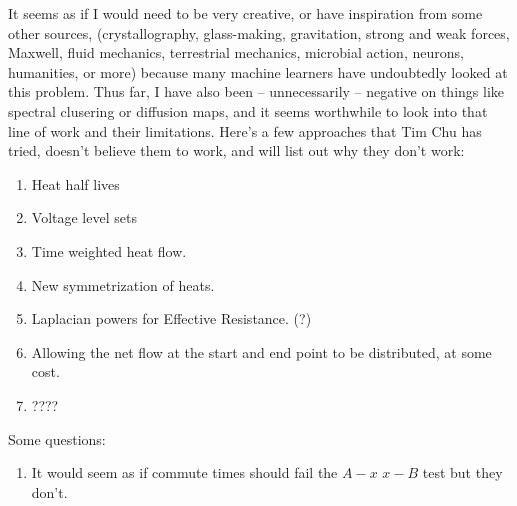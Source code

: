 It seems as if I would need to be very creative, or have
inspiration from some other sources, (crystallography,
    glass-making, gravitation, strong and weak forces, Maxwell,
    fluid mechanics, terrestrial mechanics, microbial action,
    neurons, humanities, or more) because many machine learners
have undoubtedly looked at this problem. Thus far, I have also
been -- unnecessarily -- negative on things like spectral
clusering or diffusion maps, and it seems worthwhile to look into
that line of work and their limitations.
Here's a few approaches that Tim Chu has tried, doesn't believe
them to work, and will list out why they don't work:
\begin{enumerate}
\item Heat half lives
\item Voltage level sets
\item Time weighted heat flow.
\item New symmetrization of heats.
\item Laplacian powers for Effective Resistance. (?)
\item Allowing the net flow at the start and end point to be distributed, at
some cost.
\item ????
\end{enumerate}
Some questions:
\begin{enumerate}
\item It would seem as if commute times should fail the $A-x$
$x-B$ test but they don't.
\end{enumerate}
 
%
%
